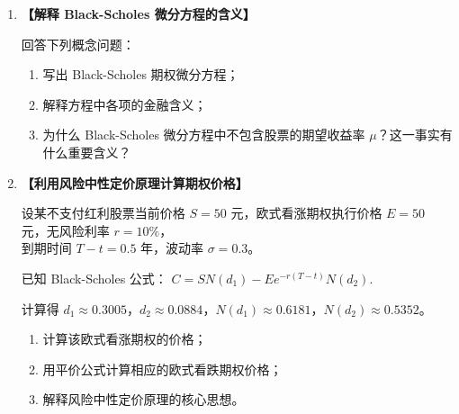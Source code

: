 \documentclass{article}
\begin{document}
\begin{enumerate}[label=\textbf{\arabic*.}]
\item  {\bf{【解释 Black-Scholes 微分方程的含义】}} %

回答下列概念问题：

\begin{enumerate}[label=(\arabic*)]
    \item 写出 Black-Scholes 期权微分方程；
    \item 解释方程中各项的金融含义；
    \item 为什么 Black-Scholes 微分方程中不包含股票的期望收益率 \(\mu\)？这一事实有什么重要含义？
\end{enumerate}




\item  {\bf{【利用风险中性定价原理计算期权价格】}} %

设某不支付红利股票当前价格 \(S = 50\) 元，欧式看涨期权执行价格 \(E = 50\) 元，无风险利率 \(r = 10\%\)， \\ 
到期时间 \(T - t = 0.5\) 年，波动率 \(\sigma = 0.3\)。

已知 Black-Scholes 公式：
\(
C = SN(d_1) - Ee^{-r(T-t)}N(d_2).  
\)

计算得 \(d_1 \approx 0.3005\)，\(d_2 \approx 0.0884\)，\(N(d_1) \approx 0.6181\)，\(N(d_2) \approx 0.5352\)。

\begin{enumerate}[label=(\arabic*)]
    \item 计算该欧式看涨期权的价格；
    \item 用平价公式计算相应的欧式看跌期权价格；
    \item 解释风险中性定价原理的核心思想。
\end{enumerate}


\end{enumerate}
\end{document}
